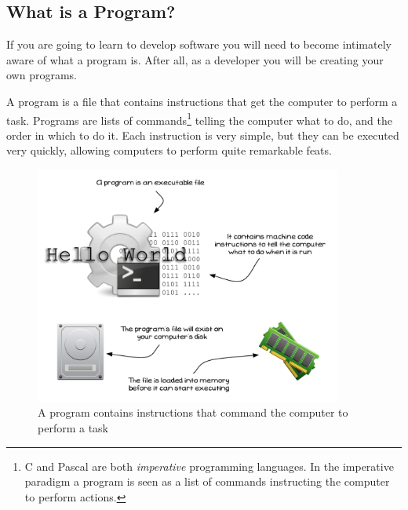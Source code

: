 \clearpage
\subsection{What is a Program?} %
\label{sub:what_is_a_program_}

If you are going to learn to develop software you will need to become intimately aware of what a program is. After all, as a developer you will be creating your own programs.

A program is a file that contains instructions that get the computer to perform a task. Programs are lists of commands\footnote{C and Pascal are both \emph{imperative} programming languages. In the imperative paradigm a program is seen as a list of commands instructing the computer to perform actions.} telling the computer what to do, and the order in which to do it. Each instruction is very simple, but they can be executed very quickly, allowing computers to perform quite remarkable feats.

\begin{figure}[h]
   \centering
   \includegraphics[width=0.9\textwidth]{./topics/programs-and-compilers/diagrams/Program} 
   \caption{A program contains instructions that command the computer to perform a task}
   \label{fig:what-is-a-program}
\end{figure}


